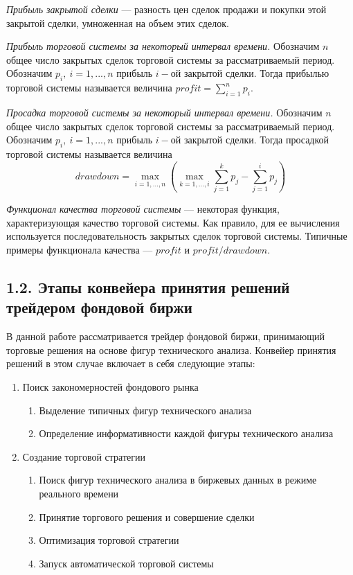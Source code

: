 \documentclass[12pt]{article}
\begin{document}
{\it Прибыль закрытой сделки} --- разность цен сделок продажи и покупки этой закрытой сделки, умноженная на объем этих сделок.

{\it Прибыль торговой системы за некоторый интервал времени.} Обозначим $n$ общее число закрытых сделок торговой системы за рассматриваемый период. Обозначим $p_i,~i=1,...,n$ прибыль $i-$ой закрытой сделки. Тогда прибылью торговой системы называется величина $profit=\sum\limits_{i=1}^n{p_i}$.

{\it Просадка торговой системы за некоторый интервал времени.} Обозначим $n$ общее число закрытых сделок торговой системы за рассматриваемый период. Обозначим $p_i,~i=1,...,n$ прибыль $i-$ой закрытой сделки. Тогда просадкой торговой системы называется величина $$drawdown=\max\limits_{i=1,...,n}\left(\max\limits_{k=1,...,i}\sum\limits_{j=1}^kp_j - \sum\limits_{j=1}^ip_j\right)$$

{\it Функционал качества торговой системы} --- некоторая функция, характеризующая качество торговой системы. Как правило, для ее вычисления используется последовательность закрытых сделок торговой системы. Типичные примеры функционала качества --- $profit$ и $profit/drawdown$.
\subsection{1.2. Этапы конвейера принятия решений трейдером фондовой биржи}
В данной работе рассматривается трейдер фондовой биржи, принимающий торговые решения на основе фигур технического анализа. Конвейер принятия решений в этом случае включает в себя следующие этапы:

\begin{enumerate}
\item Поиск закономерностей фондового рынка
\begin{enumerate}
\item Выделение типичных фигур технического анализа
\item Определение информативности каждой фигуры технического анализа
\end{enumerate}
\item Создание торговой стратегии
\begin{enumerate}
\item Поиск фигур технического анализа в биржевых данных в режиме реального времени
\item Принятие торгового решения и совершение сделки
\item Оптимизация торговой стратегии
\item Запуск автоматической торговой системы
\end{enumerate}
\end{enumerate}
\end{document}
